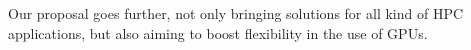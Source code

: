 \documentclass[a4paper,twoside]{article}
\begin{document}
Our proposal goes further, not only bringing solutions for all kind of HPC applications, 
but also aiming to boost flexibility in the use of GPUs.
%
%
%
%
%
%
\end{document}
